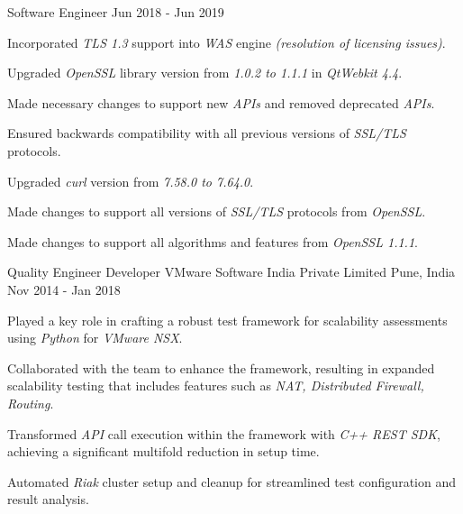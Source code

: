 \begin{cventries}
\cventry
{Software Engineer} %
{} %
{} %
{Jun 2018 - Jun 2019} %
{
\begin{cvitems}
\setlength{\itemsep}{1ex} %
%
\item {Incorporated \textit{TLS 1.3} support into \textit{WAS} engine \textit{(resolution of licensing issues)}.}
	\begin{cvitemsnested}
		\item {Upgraded \textit{OpenSSL} library version from \textit{1.0.2 to 1.1.1} in \textit{QtWebkit 4.4}.}
		\item {Made necessary changes to support new \textit{APIs} and removed deprecated \textit{APIs}.}
		\item {Ensured backwards compatibility with all previous versions of \textit{SSL/TLS} protocols.}
	\end{cvitemsnested}
\item {Upgraded \textit{curl} version from \textit{7.58.0 to 7.64.0}.}
	\begin{cvitemsnested}
		\item {Made changes to support all versions of \textit{SSL/TLS} protocols from \textit{OpenSSL}.}
		\item {Made changes to support all algorithms and features from \textit{OpenSSL 1.1.1}.}
	\end{cvitemsnested}
%
\end{cvitems}
}


\cventry
{Quality Engineer Developer} %
{VMware Software India Private Limited} %
{Pune, India} %
{Nov 2014 - Jan 2018} %
{ %
\begin{cvitems}
\item {Played a key role in crafting a robust test framework for scalability assessments using \textit{Python} for \textit{VMware NSX}.}
\item {Collaborated with the team to enhance the framework, resulting in expanded scalability testing that includes features such as \textit{NAT, Distributed Firewall, Routing}.}
\item {Transformed \textit{API} call execution within the framework with \textit{C++ REST SDK}, achieving a significant multifold reduction in setup time.}
\item {Automated \textit{Riak} cluster setup and cleanup for streamlined test configuration and result analysis.}
\end{cvitems}
}


\end{cventries}
